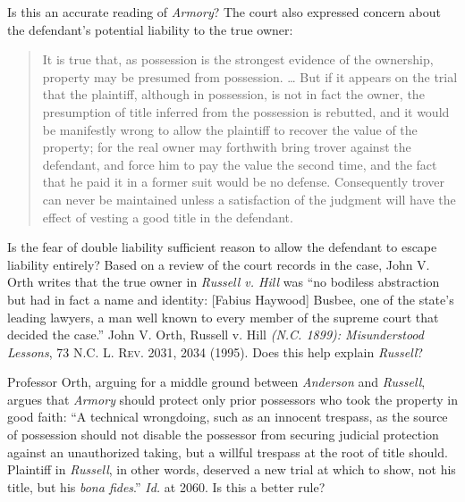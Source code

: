 Is this an accurate reading of \textit{Armory}? The court also expressed concern
about the defendant's potential liability to the true owner:
\begin{quote}
It is true that, as possession is the strongest evidence of the ownership,
property may be presumed from possession. \dots{} But if it appears on the
trial that the plaintiff, although in possession, is not in fact the owner, the
presumption of title inferred from the possession is rebutted, and it would be
manifestly wrong to allow the plaintiff to recover the value of the property;
for the real owner may forthwith bring trover against the defendant, and force
him to pay the value the second time, and the fact that he paid it in a former
suit would be no defense. Consequently trover can never be maintained unless a
satisfaction of the judgment will have the effect of vesting a good title in
the defendant.
\end{quote}
Is the fear of double liability sufficient reason to allow the defendant to
escape liability entirely? Based on a review of the court records in the case,
John V. Orth writes that the true owner in \textit{Russell v. Hill} was ``no
bodiless abstraction but had in fact a name and identity: [Fabius Haywood]
Busbee, one of the state's leading lawyers, a man well known to every member of
the supreme court that decided the case.'' John V. Orth, Russell v.
Hill \textit{(N.C. 1899): Misunderstood Lessons}, 73 \textsc{N.C. L. Rev.} 2031,
2034 (1995). Does this help explain \textit{Russell}? 

Professor Orth, arguing for a middle ground between \textit{Anderson} and
\textit{Russell}, argues that \textit{Armory} should protect only prior
possessors who took the property in good faith: ``A technical wrongdoing, such
as an innocent trespass, as the source of possession should not disable the
possessor from securing judicial protection against an unauthorized taking, but
a willful trespass at the root of title should. Plaintiff in \textit{Russell},
in other words, deserved a new trial at which to show, not his title, but his
\textit{bona fides}.'' \textit{Id.} at 2060. Is this a better rule?

